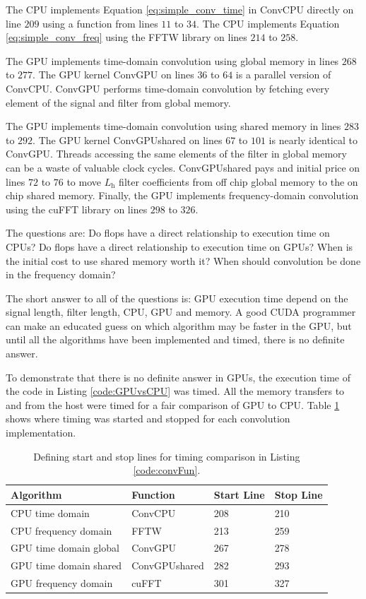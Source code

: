 The CPU implements Equation \eqref{eq:simple_conv_time} in ConvCPU directly on line $209$ using a function from lines $11$ to $34$.
The CPU implements Equation \eqref{eq:simple_conv_freq} using the FFTW library on lines $214$ to $258$.

The GPU implements time-domain convolution using global memory in lines $268$ to $277$.
The GPU kernel ConvGPU on lines $36$ to $64$ is a parallel version of ConvCPU.
ConvGPU performs time-domain convolution by fetching every element of the signal and filter from global memory.

The GPU implements time-domain convolution using shared memory in lines $283$ to $292$.
The GPU kernel ConvGPUshared on lines $67$ to $101$ is nearly identical to ConvGPU.
Threads accessing the same elements of the filter in global memory can be a waste of valuable clock cycles.
ConvGPUshared pays and initial price on lines $72$ to $76$ to move $L_\text{h}$ filter coefficients from off chip global memory to the on chip shared memory.
Finally, the GPU implements frequency-domain convolution using the cuFFT library on lines $298$ to $326$.

The questions are:
Do flops have a direct relationship to execution time on CPUs? 
Do flops have a direct relationship to execution time on GPUs? 
When is the initial cost to use shared memory worth it?
When should convolution be done in the frequency domain?

The short answer to all of the questions is: GPU execution time depend on the signal length, filter length, CPU, GPU and memory.
A good CUDA programmer can make an educated guess on which algorithm may be faster in the GPU, but until all the algorithms have been implemented and timed, there is no definite answer.

To demonstrate that there is no definite answer in GPUs, 
the execution time of the code in Listing \ref{code:GPUvsCPU} was timed.
All the memory transfers to and from the host were timed for a fair comparison of GPU to CPU.
Table \ref{tab:CPUvsGPUtimingTable} shows where timing was started and stopped for each convolution implementation.
\begin{table}
\caption{Defining start and stop lines for timing comparison in Listing \ref{code:convFun}.}
\begin{center}
\begin{tabular}{llll}
	\toprule
	Algorithm 				& Function		& Start Line	& Stop  Line		\\ \midrule
	CPU time domain 		& ConvCPU 		& 208			& 210 				\\
	CPU frequency domain 	& FFTW 			& 213			& 259 				\\
	GPU time domain global 	& ConvGPU 		& 267			& 278				\\
	GPU time domain shared 	& ConvGPUshared & 282			& 293				\\
	GPU frequency domain 	& cuFFT			& 301			& 327				\\ 
	\bottomrule
\end{tabular}
\end{center}
\label{tab:CPUvsGPUtimingTable}
\end{table}

